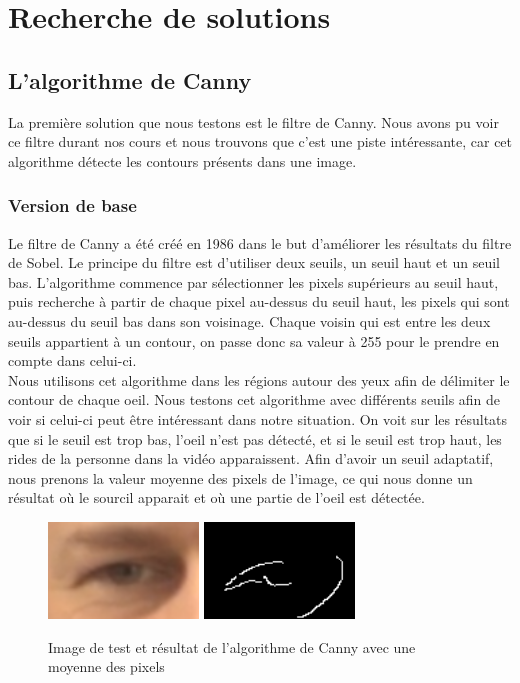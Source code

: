 \section{Recherche de solutions}

\subsection{L'algorithme de Canny}
La première solution que nous testons est le filtre de Canny. Nous avons pu voir ce filtre durant
nos cours et nous trouvons que c'est une piste intéressante, car cet algorithme détecte les contours
présents dans une image.

\subsubsection{Version de base}
Le filtre de Canny a été créé en 1986 dans le but d'améliorer les résultats du filtre de Sobel.
Le principe du filtre est d'utiliser deux seuils, un seuil haut et un seuil bas. L'algorithme
commence par sélectionner les pixels supérieurs au seuil haut, puis recherche à partir de chaque
pixel au-dessus du seuil haut, les pixels qui sont au-dessus du seuil bas dans son voisinage. 
Chaque voisin qui est entre les deux seuils appartient à un contour, on passe donc sa valeur à
255 pour le prendre en compte dans celui-ci.\\ 

Nous utilisons cet algorithme dans les régions autour des yeux afin de délimiter le contour
de chaque oeil. Nous testons cet algorithme avec différents seuils afin de voir si celui-ci
peut être intéressant dans notre situation. On voit sur les résultats que si le seuil est trop
bas, l'oeil n'est pas détecté, et si le seuil est trop haut, les rides de la personne dans la vidéo
apparaissent. Afin d'avoir un seuil adaptatif, nous prenons la valeur moyenne des pixels de l'image, ce
qui nous donne un résultat où le sourcil apparait et où une partie de l'oeil est détectée.

\begin{figure}[H]
 \center
 \includegraphics[width=4cm]{image/original.png}
 \includegraphics[width=4cm]{image/canny_moyenne.png}
 \caption{Image de test et résultat de l'algorithme de Canny avec une moyenne des pixels}
\end{figure}

